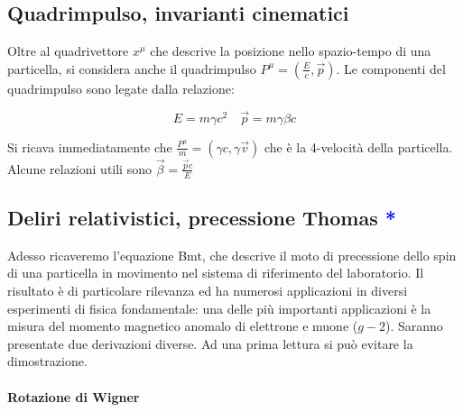 \subsection{Quadrimpulso, invarianti cinematici}

Oltre al quadrivettore $x^\mu$ che descrive la posizione nello spazio-tempo di una particella, si considera anche il quadrimpulso $P^\mu = (\frac{E}{c}, \vec{p})$. Le componenti del quadrimpulso sono legate dalla relazione:

\begin{equation*}
E = m \gamma c^2 \quad \vec{p} = m \gamma \beta c
\end{equation*}

Si ricava immediatamente che $ \frac{P^\mu}{m} = (\gamma c, \gamma \vec{v})$ che è la 4-velocità della particella. Alcune relazioni utili sono $\vec{\beta} = \frac{\vec{p} c}{E}$


\subsection{Deliri relativistici, precessione Thomas \textcolor{blue}{*}}

Adesso ricaveremo l'equazione Bmt, che descrive il moto di precessione dello spin di una particella in movimento nel sistema di riferimento del laboratorio. Il risultato è di particolare rilevanza ed ha numerosi applicazioni in diversi esperimenti di fisica fondamentale: una delle più importanti applicazioni è la misura del momento magnetico anomalo di elettrone e muone ($g - 2$). Saranno presentate due derivazioni diverse. Ad una prima lettura si può evitare la dimostrazione. 

\paragraph{Rotazione di Wigner}